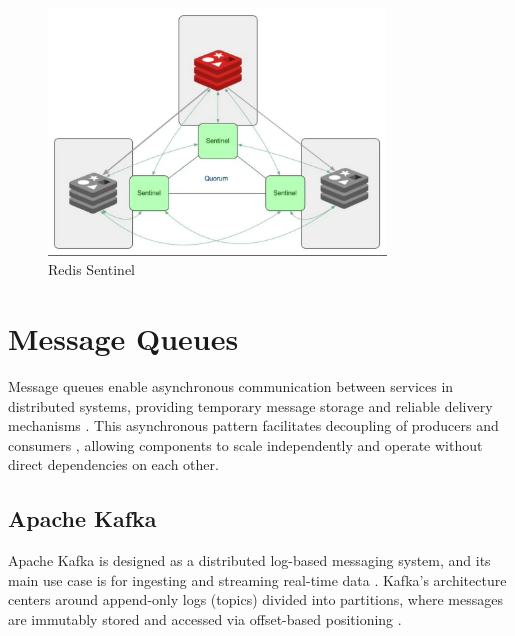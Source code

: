 \begin{figure}[H]
    \centering
    \includegraphics[width=0.8\textwidth]{figures/redis_sentinel.png}
    \caption{Redis Sentinel}
    \label{fig:redis_sentinel}
\end{figure}

\section{Message Queues}
Message queues enable asynchronous communication between services in distributed systems, providing temporary message storage and reliable delivery mechanisms \cite{queue_definition}. This asynchronous pattern facilitates decoupling of producers and consumers \cite{queue_decouple}, allowing components to scale independently and operate without direct dependencies on each other. 

\subsection{Apache Kafka}
Apache Kafka is designed as a distributed log-based messaging system, and its main use case is for ingesting and streaming real-time data \cite{kafka_definition}. Kafka's architecture centers around append-only logs (topics) divided into partitions, where messages are immutably stored and accessed via offset-based positioning \cite{kafka_documentation}.

